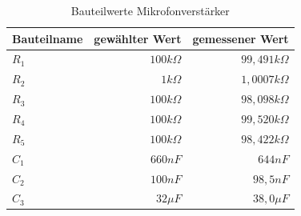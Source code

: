 \begin{table}[H]
\centering
\caption{Bauteilwerte Mikrofonverstärker}
\label{tab:Bauteile_Mikrofonv}
\begin{tabular}{|l|r|r|}
\hline
\rowcolor[HTML]{C0C0C0} 
Bauteilname & \multicolumn{1}{l|}{\cellcolor[HTML]{C0C0C0}gewählter Wert} & \multicolumn{1}{l|}{\cellcolor[HTML]{C0C0C0}gemessener Wert} \\ \hline
$R_1$       & $100k\Omega$                                                & $99,491k\Omega$                                              \\ \hline
$R_2$       & $1k\Omega$                                                  & $1,0007k\Omega$                                              \\ \hline
$R_3$       & $100k\Omega$                                                & $98,098k\Omega$                                              \\ \hline
$R_4$       & $100k\Omega$                                                & $99,520k\Omega$                                              \\ \hline
$R_5$       & $100k\Omega$                                                & $98,422k\Omega$                                              \\ \hline
$C_1$       & $660nF$                                                     & $644nF$                                                      \\ \hline
$C_2$       & $100nF$                                                     & $98,5nF$                                                     \\ \hline
$C_3$       & $32\mu F$                                                   & $38,0\mu F$                                                  \\ \hline
\end{tabular}
\end{table}


